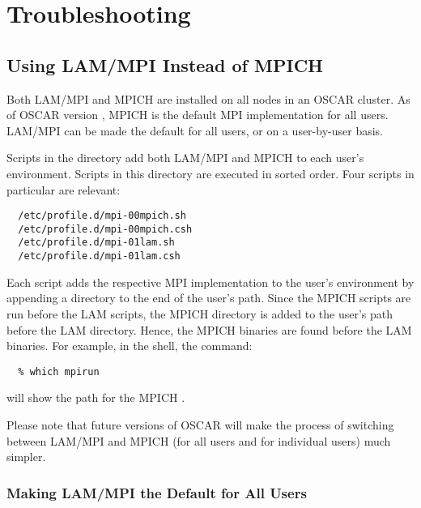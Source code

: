 %
%
%

\section{Troubleshooting}
\label{app:troubleshooting}


\subsection{Using LAM/MPI Instead of MPICH}

Both LAM/MPI and MPICH are installed on all nodes in an OSCAR cluster.
As of OSCAR version \oscarversion, MPICH is the default MPI
implementation for all users.  LAM/MPI can be made the default for all
users, or on a user-by-user basis.

Scripts in the  directory add both LAM/MPI and
MPICH to each user's environment.  Scripts in this directory are
executed in sorted order.  Four scripts in particular are relevant:

\begin{verbatim}
  /etc/profile.d/mpi-00mpich.sh
  /etc/profile.d/mpi-00mpich.csh
  /etc/profile.d/mpi-01lam.sh
  /etc/profile.d/mpi-01lam.csh
\end{verbatim}

Each script adds the respective MPI implementation to the user's
environment by appending a directory to the end of the user's path.
Since the MPICH scripts are run before the LAM scripts, the MPICH
 directory is added to the user's path before the LAM
 directory.  Hence, the MPICH binaries are found before the
LAM binaries.  For example, in the  shell, the command:

\begin{verbatim}
  % which mpirun
\end{verbatim}

\noindent will show the path for the MPICH .

Please note that future versions of OSCAR will make the process of
switching between LAM/MPI and MPICH (for all users and for individual
users) much simpler.

\subsubsection{Making LAM/MPI the Default for All Users}

